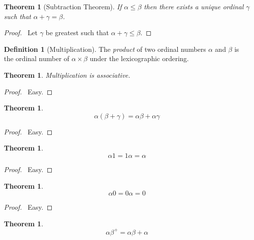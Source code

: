 \documentclass{article}
\let\qed\relax
\newtheorem{theorem}[axiom]{Theorem}
\theoremstyle{definition}
\newtheorem{definition}[axiom]{Definition}
\begin{document}
    \begin{theorem}[Subtraction Theorem]
        If $\alpha \leq \beta$ then there exists a unique ordinal $\gamma$ such that $\alpha + \gamma = \beta$.
    \end{theorem}

    \begin{proof}
        \pf\ Let $\gamma$ be greatest such that $\alpha + \gamma \leq \beta$. \qed
    \end{proof}

    \begin{definition}[Multiplication]
        The \emph{product} of two ordinal numbers $\alpha$ and $\beta$ is the ordinal number of
        $\alpha \times \beta$ under the lexicographic ordering.
    \end{definition}

    \begin{theorem}
        Multiplication is associative.
    \end{theorem}

    \begin{proof}
        \pf\ Easy. \qed
    \end{proof}

    \begin{theorem}
        \[ \alpha (\beta + \gamma) = \alpha \beta + \alpha \gamma \]
    \end{theorem}

    \begin{proof}
        \pf\ Easy. \qed
    \end{proof}

    \begin{theorem}
        \[ \alpha 1 = 1 \alpha = \alpha \]
    \end{theorem}

    \begin{proof}
        \pf\ Easy. \qed
    \end{proof}

    \begin{theorem}
        \[ \alpha 0 = 0 \alpha = 0 \]
    \end{theorem}

    \begin{proof}
        \pf\ Easy. \qed
    \end{proof}

    \begin{theorem}
        \[ \alpha \beta^+ = \alpha \beta + \alpha \]
    \end{theorem}
\end{document}
